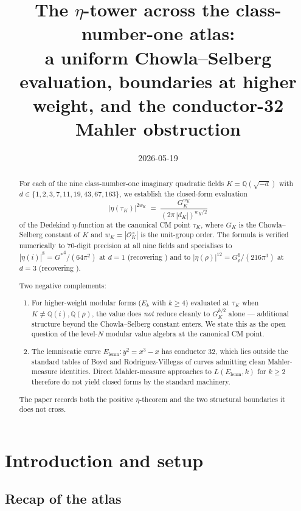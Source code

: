 \documentclass[11pt]{amsart}
\title{The $\eta$-tower across the class-number-one atlas:\\
\large a uniform Chowla--Selberg evaluation,
boundaries at higher weight, and the conductor-32 Mahler obstruction}
\author{}
\date{2026-05-19}
\theoremstyle{plain}
\theoremstyle{definition}
\theoremstyle{remark}
\newcommand{\Gs}{G^{*}}
\newcommand{\GK}{G_{K}}
\newcommand{\Q}{\mathbb{Q}}
\begin{document}
\maketitle

\begin{abstract}
For each of the nine class-number-one imaginary quadratic fields
$K = \Q(\sqrt{-d})$ with $d \in \{1, 2, 3, 7, 11, 19, 43, 67, 163\}$, we
establish the closed-form evaluation
\[
|\eta(\tau_K)|^{2 w_K} \;=\; \frac{\GK^{w_K}}{(2\pi\,|d_K|)^{w_K/2}}
\]
of the Dedekind $\eta$-function at the canonical CM point $\tau_K$, where
$\GK$ is the Chowla--Selberg constant of $K$ \cite{paper-gstar-C} and
$w_K = |\mathcal{O}_K^\times|$ is the unit-group order. The formula is
verified numerically to $70$-digit precision at all nine fields and
specialises to $|\eta(i)|^{8} = {\Gs}^{4}/(64\pi^{2})$ at $d = 1$
(recovering \cite{paper-gstar-A}) and to $|\eta(\rho)|^{12} = G_{\rho}^{6}/(216\pi^{3})$
at $d = 3$ (recovering \cite[\S 15]{paper-gstar-A}).

Two negative complements:
\begin{enumerate}[label=\textup{(\arabic*)}, leftmargin=*, itemsep=2pt]
\item For higher-weight modular forms ($E_{k}$ with $k \geq 4$) evaluated
at $\tau_{K}$ when $K \neq \Q(i), \Q(\rho)$, the value does \emph{not}
reduce cleanly to $\GK^{k/2}$ alone --- additional structure beyond the
Chowla--Selberg constant enters. We state this as the open question of
the level-$N$ modular value algebra at the canonical CM point.
\item The lemniscatic curve $E_{\mathrm{lemn}}: y^{2} = x^{3} - x$ has
conductor $32$, which lies outside the standard tables of Boyd and
Rodriguez-Villegas of curves admitting clean Mahler-measure identities.
Direct Mahler-measure approaches to $L(E_{\mathrm{lemn}}, k)$ for $k \geq 2$
therefore do not yield closed forms by the standard machinery.
\end{enumerate}
The paper records both the positive $\eta$-theorem and the two structural
boundaries it does not cross.
\end{abstract}

\tableofcontents

\section{Introduction and setup}\label{sec:intro}

\subsection{Recap of the atlas}
\end{document}

